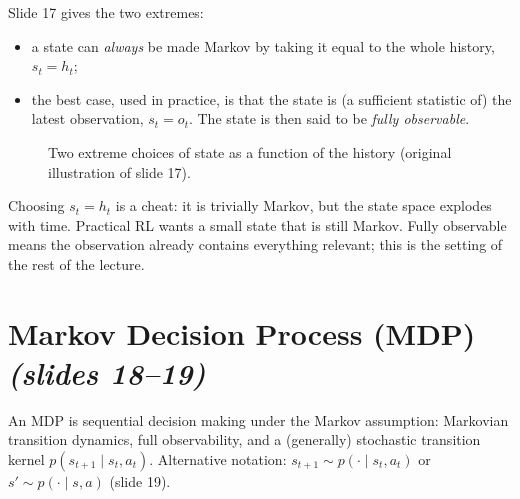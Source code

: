 \documentclass[11pt,a4paper]{article}
\newcommand{\slr}[1]{\texorpdfstring{\emph{(slides #1)}}{(slides #1)}}
\theoremstyle{plain}
\theoremstyle{definition}
\theoremstyle{remark}
\begin{document}
Slide 17 gives the two extremes:
\begin{itemize}[nosep]
  \item a state can \emph{always} be made Markov by taking it equal to the whole history, $s_t=h_t$;
  \item the best case, used in practice, is that the state is (a sufficient statistic of) the latest observation, $s_t=o_t$. The state is then said to be \emph{fully observable}.
\end{itemize}

\begin{figure}[htbp]
\centering
{}
\caption{Two extreme choices of state as a function of the history (original illustration of slide 17).}
\end{figure}

\begin{intuition}
Choosing $s_t=h_t$ is a cheat: it is trivially Markov, but the state space explodes with time. Practical RL wants a small state that is still Markov. Fully observable means the observation already contains everything relevant; this is the setting of the rest of the lecture.
\end{intuition}

\section{Markov Decision Process (MDP) \slr{18--19}}
An MDP is sequential decision making under the Markov assumption: Markovian transition dynamics, full observability, and a (generally) stochastic transition kernel $p(s_{t+1}\mid s_t,a_t)$. Alternative notation: $s_{t+1}\sim p(\cdot\mid s_t,a_t)$ or $s'\sim p(\cdot\mid s,a)$ (slide 19).
\end{document}
